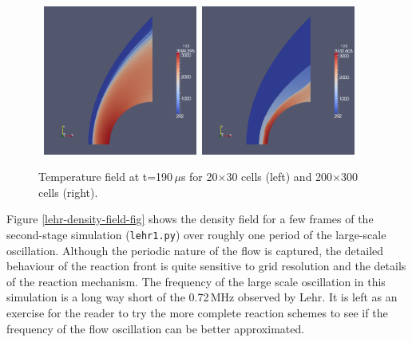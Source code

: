 \begin{figure}[htbp]
\begin{center}
\mbox{
\includegraphics[width=0.45\textwidth]{../2D/lehr-479/lehr-479-T-field-t0019-20x30.png}
\includegraphics[width=0.45\textwidth]{../2D/lehr-479/lehr-479-T-field-t0019-200x300.png}
}
\end{center}
\caption{Temperature field at t=190\,$\mu$s for 20$\times$30 cells (left) and 200$\times$300 cells (right).}
\label{lehr-T-field-fig}
\end{figure}

\medskip
Figure \ref{lehr-density-field-fig} shows the density field for a few frames 
of the second-stage simulation (\texttt{lehr1.py}) over roughly one period of the large-scale oscillation.
Although the periodic nature of the flow is captured, the detailed behaviour of the reaction front 
is quite sensitive to grid resolution and the details of the reaction mechanism.
The frequency of the large scale oscillation in this simulation is a long way short of the 0.72\,MHz 
observed by Lehr.
It is left as an exercise for the reader to try the more complete reaction schemes to see if the frequency 
of the flow oscillation can be better approximated.

